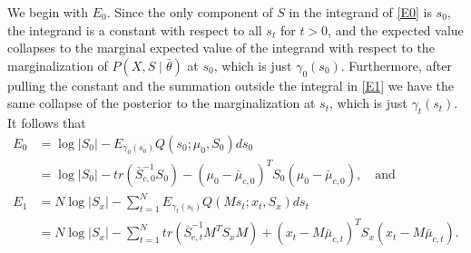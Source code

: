 \documentclass[12pt,leqno]{article}
\begin{document}
We begin with $E_0$. Since the only component of $S$ in the integrand of \eqref{E0} is $s_0$, the integrand is a constant
with respect to all $s_t$ for $t > 0$, and the expected value
collapses to the marginal 
expected value of the integrand with respect to the marginalization of $P(X,S\mid\bar{\theta})$ at $s_0$, which is just 
$\gamma_0(s_0)$.  Furthermore, after pulling the constant and the summation 
outside the integral in \eqref{E1} we have the same collapse of the posterior to the marginalization at $s_t$, which
is just $\gamma_t(s_t)$.  It follows that
\begin{align}
  E_0 &= \log|S_0| - E_{\gamma_0(s_0)}Q(s_0;\mu_0,S_0)ds_0 \\
  &= \log|S_0| - tr(\overline{S}_{c,0}^{-1}S_0) - (\mu_0-\bar{\mu}_{c,0})^TS_0(\mu_0 - \bar{\mu}_{c,0}),
  \label{E0:1}\quad\text{and}\\
  E_1 &= N\log|S_x| - \sum_{t=1}^NE_{\gamma_t(s_t)}Q(Ms_t;x_t,S_x)ds_t \\
  &= N\log|S_x| - \sum_{t=1}^Ntr(\overline{S}_{c,t}^{-1}M^TS_xM) + (x_t-M\bar{\mu}_{c,t})^TS_x(x_t-M\bar{\mu}_{c,t})\label{E1:1}.
\end{align}
\end{document}

